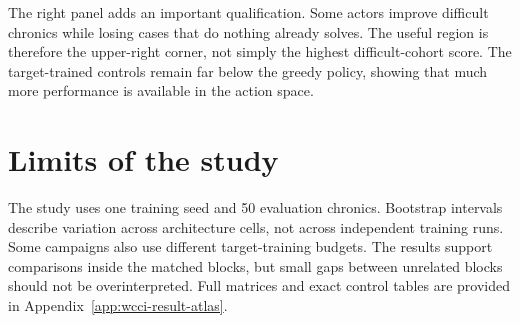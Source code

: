 The right panel adds an important qualification. Some actors improve difficult
chronics while losing cases that do nothing already solves. The useful region
is therefore the upper-right corner, not simply the highest difficult-cohort
score. The target-trained controls remain far below the greedy policy, showing
that much more performance is available in the action space.

\section{Limits of the study}

The study uses one training seed and 50 evaluation chronics. Bootstrap intervals
describe variation across architecture cells, not across independent training
runs. Some campaigns also use different target-training budgets. The results
support comparisons inside the matched blocks, but small gaps between unrelated
blocks should not be overinterpreted. Full matrices and exact control tables are
provided in Appendix~\ref{app:wcci-result-atlas}.


